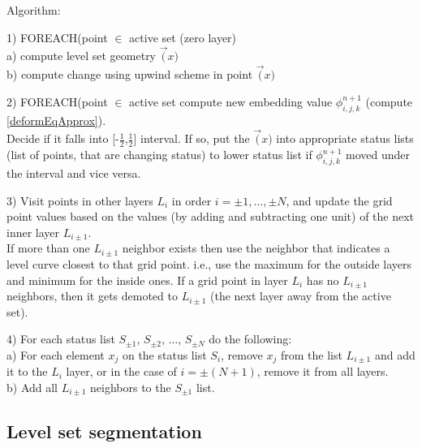 \par
Algorithm:
\label{alg:sparseFileld}
\par
1) FOREACH(point $\in$ active set (zero layer)\\
  a) compute level set geometry $\vec(x)$\\
  b) compute change using upwind scheme in point $\vec(x)$
\par
2) FOREACH(point $\in$ active set compute new embedding value $\phi_{i,j,k}^{n+1}$ (compute \ref{deformEqApprox}).\\
Decide if it falls into [-$\frac{1}{2}$,$\frac{1}{2}$] interval.
If so, put the $\vec(x)$ into appropriate status lists (list of points, that are changing status) to lower status list if $\phi_{i,j,k}^{n+1}$ moved under the interval and vice versa.
\par
3) Visit points in other layers $L_i$ in order $i=\pm 1,\ldots, \pm N$, and update the grid point values based on the values (by adding and subtracting one unit) of the next inner layer $L_{i\pm1}$.\\
If more than one $L_{i\pm1}$ neighbor exists then use the neighbor that indicates a level curve closest to that grid point. i.e., use the maximum for the outside layers and minimum for the inside ones.
If a grid point in layer $L_i$ has no $L_{i\pm1}$ neighbors, then it gets demoted to $L_{i\pm1}$ (the next layer away from the active set).
\par
4) For each status list $S_{\pm1}$, $S_{\pm2}$, $\ldots$, $S_{\pm N}$ do the following:\\
  a) For each element $x_j$ on the status list $S_i$, remove $x_j$ from the list $L_{i\pm1}$ and add it to the $L_{i}$ layer, or in the case of $i=\pm (N + 1)$, remove it from all layers.\\
  b) Add all $L_{i\pm1}$ neighbors to the $S_{\pm1}$ list.

\subsection{Level set segmentation}

